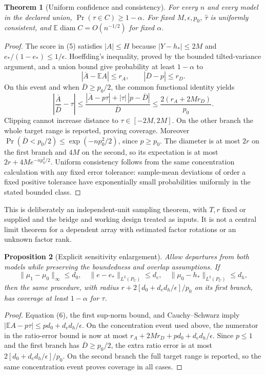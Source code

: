 \documentclass[11pt]{article}
\newtheorem{theorem}{Theorem}
\newtheorem{proposition}[theorem]{Proposition}
\theoremstyle{remark}
\newcommand{\E}{\mathbb E}
\newcommand{\diam}{\operatorname{diam}}
\begin{document}
\begin{theorem}[Uniform confidence and consistency]
For every $n$ and every model in the declared union,
$\Pr(\tau\in C)\geq1-\alpha$.
For fixed $M,\epsilon,p_0$, $\widehat\tau$ is uniformly consistent,
and $\E\diam C=O(n^{-1/2})$ for fixed $\alpha$.
\end{theorem}
\begin{proof}
The score in (5) satisfies $|A|\leq H$ because
$|Y-h_*|\leq2M$ and $e_* /(1-e_*)\leq1/\epsilon$.
Hoeffding's inequality, proved by the bounded tilted-variance argument,
and a union bound give probability at least $1-\alpha$ to
\[
 |\overline A-\E A|\leq r_A,\qquad
 |\overline D-p|\leq r_D.
\]
On this event and when $\overline D\geq p_0/2$, the common functional
identity yields
\[
 \left|\frac{\overline A}{\overline D}-\tau\right|
 \leq\frac{|\overline A-p\tau|+|\tau|\,|p-\overline D|}
                 {\overline D}
 \leq\frac{2(r_A+2Mr_D)}{p_0}.
\]
Clipping cannot increase distance to $\tau\in[-2M,2M]$. On the other
branch the whole target range is reported, proving coverage.
Moreover
$\Pr(\overline D<p_0/2)\leq\exp(-np_0^2/2)$, since $p\geq p_0$.
The diameter is at most $2r$ on the first branch and $4M$ on the second,
so its expectation is at most $2r+4M e^{-np_0^2/2}$.
Uniform consistency follows from the same concentration calculation with
any fixed error tolerance: sample-mean deviations of order a fixed
positive tolerance have exponentially small probabilities uniformly
in the stated bounded class.
\end{proof}

This is deliberately an independent-unit sampling theorem, with $T,r$
fixed or supplied and the bridge and working design treated as inputs.
It is not a central limit theorem for a dependent array with estimated
factor rotations or an unknown factor rank.

\begin{proposition}[Explicit sensitivity enlargement]
Allow departures from both models while preserving the boundedness and
overlap assumptions. If
\[
 \|\mu_1-\mu_0\|_\infty\leq d_0,\quad
 \|e-e_*\|_{L^2(P_U)}\leq d_e,\quad
 \|\mu_0-h_*\|_{L^2(P_U)}\leq d_h,
\]
then the same procedure, with radius
$r+2[d_0+d_ed_h/\epsilon]/p_0$ on its first branch, has coverage at
least $1-\alpha$ for $\tau$.
\end{proposition}
\begin{proof}
Equation (6), the first sup-norm bound, and Cauchy--Schwarz imply
$|\E A-p\tau|\leq p d_0+d_ed_h/\epsilon$.
On the concentration event used above, the numerator in the ratio-error
bound is now at most $r_A+2Mr_D+pd_0+d_ed_h/\epsilon$.
Since $p\leq1$ and the first branch has $\overline D\geq p_0/2$,
the extra ratio error is at most $2[d_0+d_ed_h/\epsilon]/p_0$.
On the second branch the full target range is reported, so the same
concentration event proves coverage in all cases.
\end{proof}
\end{document}
